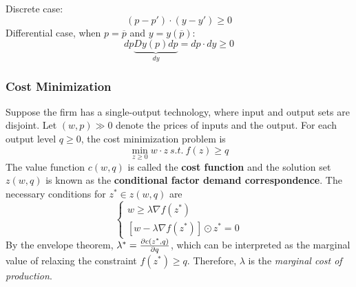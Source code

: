 \documentclass{article}
\begin{document}
	 		\begin{proposition}
	 			Discrete case:
	 			\begin{equation}
	 				(p-p') \cdot (y-y') \geq 0
	 			\end{equation}
	 			Differential case, when $p = \overline{p}$ and $y = y(\overline{p})$:
	 			\begin{equation}
	 				dp \underbrace{Dy(p) dp}_{dy} = dp \cdot dy \geq 0
	 			\end{equation}
	 		\end{proposition}
	 		
	 		\subsubsection{Cost Minimization}
	 		\begin{definition}[CMP]
	 			Suppose the firm has a single-output technology, where input and output sets are disjoint. Let $(w, p) \gg 0$ denote the prices of inputs and the output. For each output level $q \geq 0$, the cost minimization problem is 
	 			\begin{equation}
	 				\min_{z \geq 0} w \cdot z\ s.t.\ f(z) \geq q
	 			\end{equation}
	 			The value function $c(w, q)$ is called the \textbf{cost function} and the solution set $z(w, q)$ is known as the \textbf{conditional factor demand correspondence}. The necessary conditions for $z^* \in z(w, q)$ are
	 			\begin{equation}
	 				\begin{cases}
	 					w \geq \lambda \nabla f(z^*) \\
	 					\left[w - \lambda \nabla f(z^*) \right] \odot z^* = 0
	 				\end{cases}
	 			\end{equation}
	 			By the envelope theorem, $\lambda^* = \frac{\partial{c(z^*, q)}}{\partial{q}}$, which can be interpreted as the marginal value of relaxing the constraint $f(z^*) \geq q$. Therefore, $\lambda$ is the \emph{marginal cost of production}.
	 		\end{definition}
	 		
\end{document}
